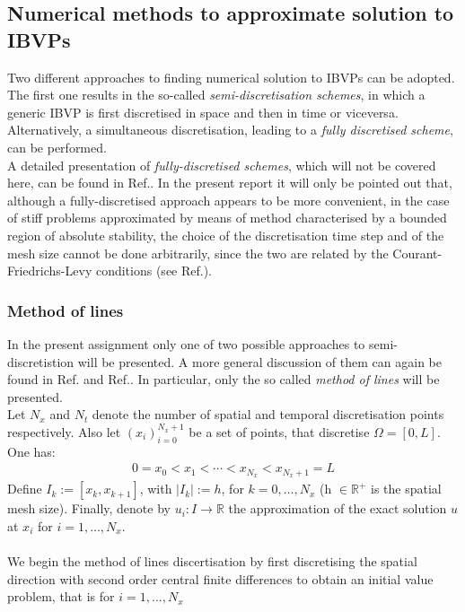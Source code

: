 \documentclass[11pt]{article}
\theoremstyle{theorem}
\theoremstyle{definition}
\begin{document}
\subsection{Numerical methods to approximate solution to IBVPs}
Two different approaches to finding numerical solution to IBVPs can be adopted. The first one results in the so-called \emph{semi-discretisation schemes}, in which a generic IBVP is first discretised in space and then in time or viceversa. Alternatively, a simultaneous discretisation, leading to a \emph{fully discretised scheme}, can be performed.\\
A detailed presentation of \emph{fully-discretised schemes}, which will not be covered here, can be found in Ref.\cite{numerical-math}. In the present report it will only be pointed out that, although a fully-discretised approach appears to be more convenient, in the case of stiff problems approximated by means of method characterised by a bounded region of absolute stability, the choice of the discretisation time step and of the mesh size cannot be done arbitrarily, since the two are related by the Courant-Friedrichs-Levy conditions (see Ref.\cite{numerical-math}).\\

\subsubsection{Method of lines}
In the present assignment only one of two possible approaches to semi-discretistion will be presented. A more general discussion of them can again be found in Ref.\cite{numerical-math} and Ref.\cite{lec-notes}. In particular, only the so called \emph{method of lines} will be presented.\\

Let $ N_x $ and $ N_t $ denote the number of spatial and temporal discretisation points respectively. Also let $ (x_i)_{i=0}^{N_x + 1} $ be a set of points, that discretise $ \Omega = [0,L] $. One has:
\begin{align*}
0 = x_0 < x_1 < \cdots < x_{N_x} < x_{N_x + 1} = L
\end{align*}
Define $ I_k := [x_{k},x_{k+1}] $, with $ |I_k| := h $, for $ k = 0,\ldots,N_x $ (h $\in  \mathbb{R}^+$  is the spatial mesh size). Finally, denote by $ u_i : I \to \mathbb{R}$ the approximation of the exact solution $ u $ at $ x_i $ for $ i = 1,\ldots,N_x $.
\\\\
We begin the method of lines discertisation by first discretising the spatial direction with second order central finite differences to obtain an initial value problem, that is for $ i = 1,\ldots,N_x $
\end{document}
